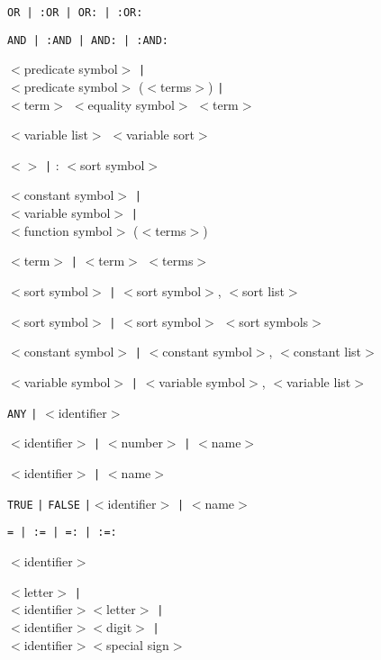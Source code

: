 %
{{\tt OR  {\tt |}  :OR  {\tt |}  OR:  {\tt |}  :OR: }}

%
{{\tt AND  {\tt |}  :AND  {\tt |}  AND:  {\tt |}  :AND: }}

%
{$<$predicate symbol$>$  {\tt |}\\
$<$predicate symbol$>$ ($<$terms$>$)  {\tt |}\\
$<$term$>$ $<$equality symbol$>$ $<$term$>$}

%
{$<$variable list$>$  $<$variable sort$>$}

%
{$<>$  {\tt |}  :  $<$sort symbol$>$}

%
{$<$constant symbol$>$  {\tt |}\\  $<$variable symbol$>$  {\tt |}\\ $<$function symbol$>$ 
($<$terms$>$)}

%
{$<$term$>$  {\tt |}  $<$term$>$  $<$terms$>$}

%
{$<$sort symbol$>$  {\tt |} $<$sort symbol$>$,  $<$sort list$>$}

%
{$<$sort symbol$>$  {\tt |} $<$sort symbol$>$  $<$sort symbols$>$}

%
{$<$constant symbol$>$  {\tt |} $<$constant symbol$>$, $<$constant list$>$}

%
{$<$variable symbol$>$  {\tt |}  $<$variable symbol$>$, $<$variable list$>$}

%
{{\tt ANY} {\tt |}  $<$identifier$>$}

%
{$<$identifier$>$ {\tt |} $<$number$>$  {\tt |}  $<$name$>$}

%
{$<$identifier$>$  {\tt |}  $<$name$>$}

%
{{\tt TRUE}  {\tt |}  {\tt FALSE} {\tt |}$<$identifier$>$  {\tt |}  $<$name$>$}

%
{{\tt =  {\tt |}  :=  {\tt |}  =: {\tt |}  :=: }}

%
{$<$identifier$>$}

%
{$<$letter$>$  {\tt |}\\ $<$identifier$>$$<$letter$>$  {\tt |}\\
$<$identifier$>$$<$digit$>$  {\tt |}  \\
$<$iden\-ti\-fier$>$$<$spe\-cial sign$>$} 

